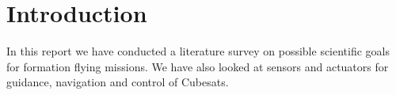 \section{Introduction}
In this report we have conducted a literature survey on possible scientific goals for formation flying missions. We have also looked at sensors and actuators for guidance, navigation and control of Cubesats. 
